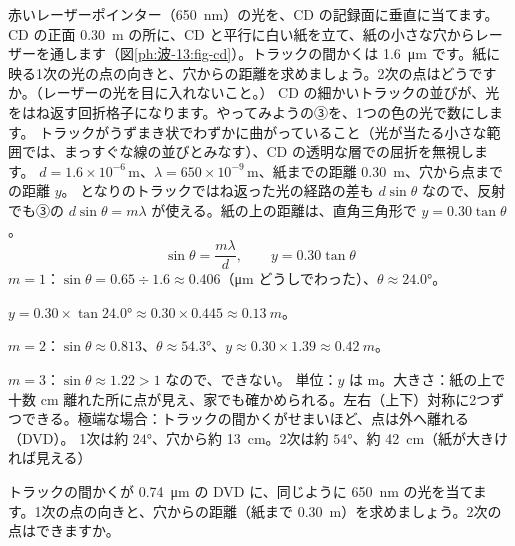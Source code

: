 \begin{phreidai}[CD に赤いレーザーを当てる]
\label{ph:波-13:ex4}赤いレーザーポインター（\qty{650}{nm}）の光を、CD の記録面に垂直に当てます。CD の正面 \qty{0.30}{m} の所に、CD と平行に白い紙を立て、紙の小さな穴からレーザーを通します（図\ref{ph:波-13:fig-cd}）。トラックの間かくは \qty{1.6}{\micro m} です。紙に映る1次の光の点の向きと、穴からの距離を求めましょう。2次の点はどうですか。（レーザーの光を目に入れないこと。）
\phbamen
CD の細かいトラックの並びが、光をはね返す回折格子になります。やってみようの③を、1つの色の光で数にします。
\phmushi
トラックがうずまき状でわずかに曲がっていること（光が当たる小さな範囲では、まっすぐな線の並びとみなす）、CD の透明な層での屈折を無視します。
\phzu
$d=1.6\times10^{-6}$\,m、$\lambda=650\times10^{-9}$\,m、紙までの距離 \qty{0.30}{m}、穴から点までの距離 $y$。
\phriyu
となりのトラックではね返った光の経路の差も $d\sin\theta$ なので、反射でも③の $d\sin\theta=m\lambda$ が使える。紙の上の距離は、直角三角形で $y=0.30\tan\theta$。
\phtateru
\[ \sin\theta=\frac{m\lambda}{d},\qquad y=0.30\tan\theta \]
\phtoku
$m=1$：$\sin\theta=0.65\div1.6\approx0.406$（\unit{\micro m} どうしでわった）、$\theta\approx24.0°$。\par
$y=0.30\times\tan24.0°\approx0.30\times0.445\approx\qty{0.13}{m}$。\par
$m=2$：$\sin\theta\approx0.813$、$\theta\approx54.3°$、$y\approx0.30\times1.39\approx\qty{0.42}{m}$。\par
$m=3$：$\sin\theta\approx1.22>1$ なので、できない。
\phtashikame
単位：$y$ は m。大きさ：紙の上で十数 cm 離れた所に点が見え、家でも確かめられる。左右（上下）対称に2つずつできる。極端な場合：トラックの間かくがせまいほど、点は外へ離れる（DVD）。
\kotae 1次は約 $24°$、穴から約 \qty{13}{cm}。2次は約 $54°$、約 \qty{42}{cm}（紙が大きければ見える）
\end{phreidai}
\begin{jibun}
トラックの間かくが \qty{0.74}{\micro m} の DVD に、同じように \qty{650}{nm} の光を当てます。1次の点の向きと、穴からの距離（紙まで \qty{0.30}{m}）を求めましょう。2次の点はできますか。
\end{jibun}

